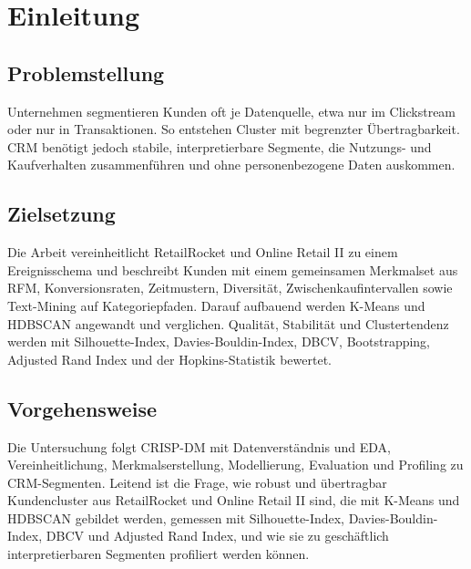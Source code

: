 \documentclass[
  11pt,
  openany, oneside]{book}
\begin{document}
\clearpage

\tableofcontents
\thispagestyle{nohead}
\clearpage

\clearpage
\listoffigures
\thispagestyle{nohead} 
\clearpage

\clearpage
\thispagestyle{nohead} 
\listoftables
\clearpage

\pagestyle{fancy}
\mainmatter
{}


\mainmatter
\chapter{Einleitung}\label{sec-einleitung}

\section{Problemstellung}\label{sec-problemstellung}

Unternehmen segmentieren Kunden oft je Datenquelle, etwa nur im
Clickstream oder nur in Transaktionen. So entstehen Cluster mit
begrenzter Übertragbarkeit. CRM benötigt jedoch stabile,
interpretierbare Segmente, die Nutzungs- und Kaufverhalten
zusammenführen und ohne personenbezogene Daten auskommen.

\section{Zielsetzung}\label{sec-zielsetzung}

Die Arbeit vereinheitlicht RetailRocket und Online Retail II zu einem
Ereignisschema und beschreibt Kunden mit einem gemeinsamen Merkmalset
aus RFM, Konversionsraten, Zeitmustern, Diversität,
Zwischenkaufintervallen sowie Text-Mining auf Kategoriepfaden. Darauf
aufbauend werden K-Means und HDBSCAN angewandt und verglichen. Qualität,
Stabilität und Clustertendenz werden mit Silhouette-Index,
Davies-Bouldin-Index, DBCV, Bootstrapping, Adjusted Rand Index und der
Hopkins-Statistik bewertet.

\section{Vorgehensweise}\label{sec-vorgehensweise}

Die Untersuchung folgt CRISP-DM mit Datenverständnis und EDA,
Vereinheitlichung, Merkmalserstellung, Modellierung, Evaluation und
Profiling zu CRM-Segmenten. Leitend ist die Frage, wie robust und
übertragbar Kundencluster aus RetailRocket und Online Retail II sind,
die mit K-Means und HDBSCAN gebildet werden, gemessen mit
Silhouette-Index, Davies-Bouldin-Index, DBCV und Adjusted Rand Index,
und wie sie zu geschäftlich interpretierbaren Segmenten profiliert
werden können.
\end{document}
